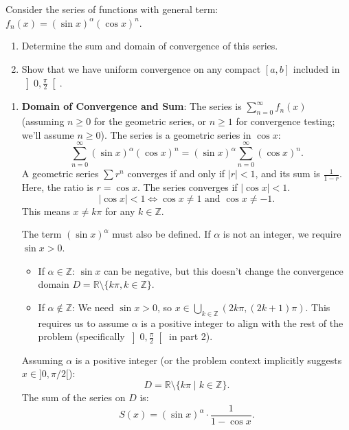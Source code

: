 \documentclass[12pt]{article}
\begin{document}
\section{}
Consider the series of functions with general term: $f_n(x) = (\sin x)^\alpha (\cos x)^n$.
\begin{enumerate}
    \item Determine the sum and domain of convergence of this series.
    \item Show that we have uniform convergence on any compact $[a, b]$ included in $\left]0, \frac{\pi}{2}\right[$.
\end{enumerate}

\begin{correctionbox}
\begin{enumerate}
    \item \textbf{Domain of Convergence and Sum}:
    The series is $\sum_{n=0}^\infty f_n(x)$ (assuming $n \geq 0$ for the geometric series, or $n \geq 1$ for convergence testing; we'll assume $n \geq 0$).
    The series is a geometric series in $\cos x$:
    $$ \sum_{n=0}^\infty (\sin x)^\alpha (\cos x)^n = (\sin x)^\alpha \sum_{n=0}^\infty (\cos x)^n. $$
    A geometric series $\sum r^n$ converges if and only if $|r| < 1$, and its sum is $\frac{1}{1-r}$.
    Here, the ratio is $r = \cos x$. The series converges if $|\cos x| < 1$.
    $$ |\cos x| < 1 \iff \cos x \neq 1 \text{ and } \cos x \neq -1. $$
    This means $x \neq k\pi$ for any $k \in \mathbb{Z}$.
    
    The term $(\sin x)^\alpha$ must also be defined. If $\alpha$ is not an integer, we require $\sin x > 0$.
    \begin{itemize}
        \item If $\alpha \in \mathbb{Z}$: $\sin x$ can be negative, but this doesn't change the convergence domain $D = \mathbb{R} \setminus \{k\pi, k \in \mathbb{Z}\}$.
        \item If $\alpha \notin \mathbb{Z}$: We need $\sin x > 0$, so $x \in \bigcup_{k \in \mathbb{Z}} (2k\pi, (2k+1)\pi)$. This requires us to assume $\alpha$ is a positive integer to align with the rest of the problem (specifically $\left]0, \frac{\pi}{2}\right[$ in part 2).

    \end{itemize}
    Assuming $\alpha$ is a positive integer (or the problem context implicitly suggests $x \in ]0, \pi/2[$):
    $$ D = \mathbb{R} \setminus \{k\pi \mid k \in \mathbb{Z}\}. $$
    The sum of the series on $D$ is:
    $$ S(x) = (\sin x)^\alpha \cdot \frac{1}{1-\cos x}. $$


\end{enumerate}
\end{correctionbox}
\end{document}
